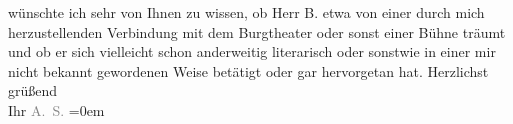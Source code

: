 \begin{ledgroupsized}[t]{13cm}
{{{               }}}\label{K_L02256-4h} wünschte ich sehr von Ihnen zu wissen, ob Herr B. etwa von einer durch mich herzustellenden Verbindung mit dem
                  Burgtheater oder sonst einer Bühne träumt und
               ob er sich vielleicht schon anderweitig literarisch oder sonstwie in einer mir nicht
               bekannt gewordenen Weise betätigt oder gar hervorgetan hat.\pend
           \pstart
           Herzlichst grüßend{\\[\baselineskip]}Ihr \spacefill\mbox{\textcolor{gray}{A. S.}}\pend
           \leftskip=0em{}
         
         \endnumbering{}\end{ledgroupsized}  \newcommand{\dateiname}{L02256}\newcommand{\titel}{Arthur Schnitzler an Hugo von Hofmannsthal, 19. 2. 1917}\newcommand{\editorInnen}{Martin Anton Müller und Gerd-Hermann Susen}
      